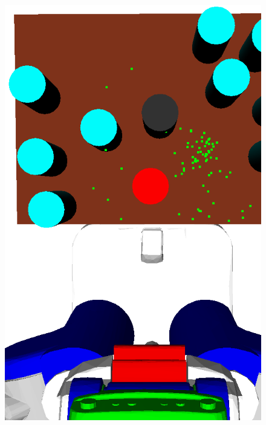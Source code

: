 \begin{figure}[t]
  \vspace{0.5em}
  \centering
    \noindent
    \includegraphics[scale=0.13]{images/grasp_context_1.png}

\end{figure}
